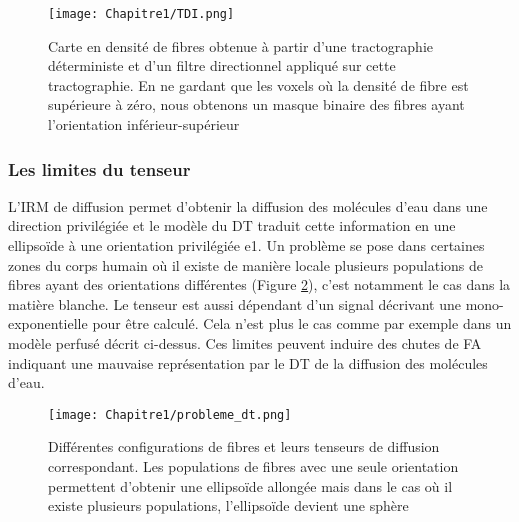 \begin{figure}[!h]
  \begin{center}
    \texttt{[image: Chapitre1/TDI.png]}
     \end{center}
    \caption{ Carte en densité de fibres obtenue à partir d’une tractographie déterministe et d’un filtre directionnel appliqué sur cette tractographie. En ne gardant que les voxels où la densité de fibre est supérieure à zéro, nous obtenons un masque binaire des fibres ayant l’orientation inférieur-supérieur}
  \label{fig:TDI}
\end{figure}
\clearpage



\subsubsection{Les limites du tenseur}
L’IRM de diffusion permet d’obtenir la diffusion des molécules d’eau dans une direction privilégiée et le modèle du DT traduit cette information en une ellipsoïde à une orientation privilégiée e1. Un problème se pose dans certaines zones du corps humain où il existe de manière locale plusieurs populations de fibres ayant des orientations différentes (Figure \ref{fig:dti_limite}), c’est notamment le cas dans la matière blanche. Le tenseur est aussi dépendant d’un signal décrivant une mono-exponentielle pour être calculé. Cela n’est plus le cas comme par exemple dans un modèle perfusé décrit ci-dessus. Ces limites peuvent induire des chutes de FA indiquant une mauvaise représentation par le DT de la diffusion des molécules d’eau.

 \begin{figure}[!h]
  \begin{center}
    \texttt{[image: Chapitre1/probleme\_dt.png]}
     \end{center}
    \caption{Différentes configurations de fibres et leurs tenseurs de diffusion correspondant. Les populations de fibres avec une seule orientation permettent d’obtenir une ellipsoïde allongée mais dans le cas où il existe plusieurs populations, l’ellipsoïde devient une sphère}
  \label{fig:dti_limite}
\end{figure}

